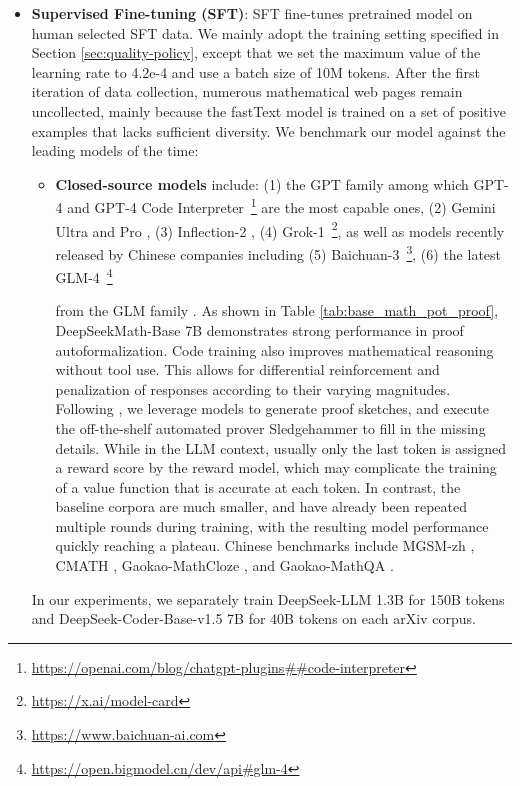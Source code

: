 \begin{itemize}
    \item  \textbf{Supervised Fine-tuning (SFT)}: SFT fine-tunes pretrained model on human selected SFT data. We mainly adopt the training setting specified in Section \ref{sec:quality-policy}, except that we set the maximum value of the learning rate to 4.2e-4 and use a batch size of 10M tokens. After the first iteration of data collection, numerous mathematical web pages remain uncollected, mainly because the fastText model is trained on a set of positive examples that lacks sufficient diversity. We benchmark our model against the leading models of the time:

\begin{itemize}[topsep=0pt]
    \item \textbf{Closed-source models} include: (1) the GPT family among which GPT-4 \citep{gpt4} and GPT-4 Code Interpreter~\footnote{\url{https://openai.com/blog/chatgpt-plugins\#\#code-interpreter}} are the most capable ones, (2) Gemini Ultra and Pro \citep{gemini}, (3) Inflection-2 \citep{inflection-2}, (4) Grok-1~\footnote{\url{https://x.ai/model-card}},
    as well as models recently released by Chinese companies including (5) Baichuan-3~\footnote{\url{https://www.baichuan-ai.com}},
    (6) the latest GLM-4~\footnote{\url{https://open.bigmodel.cn/dev/api\#glm-4}}

    from the GLM family \citep{glm}. As shown in Table \ref{tab:base_math_pot_proof}, DeepSeekMath-Base 7B demonstrates strong performance in proof autoformalization. Code training also improves mathematical reasoning without tool use. This allows for differential reinforcement and penalization of responses according to their varying magnitudes. Following \cite{dsp_proof}, we leverage models to generate proof sketches, and execute the off-the-shelf automated prover Sledgehammer \citep{sledgehammer} to fill in the missing details. While in the LLM context, usually only the last token is assigned a reward score by the reward model, which may complicate the training of a value function that is accurate at each token. In contrast, the baseline corpora are much smaller, and have already been repeated multiple rounds during training, with the resulting model performance quickly reaching a plateau. Chinese benchmarks include MGSM-zh \citep{mgsm}, CMATH \citep{wei2023cmath}, Gaokao-MathCloze \citep{agieval}, and Gaokao-MathQA \citep{agieval}. \end{itemize}

In our experiments, we separately train DeepSeek-LLM 1.3B for 150B tokens and DeepSeek-Coder-Base-v1.5 7B for 40B tokens on each arXiv corpus. \end{itemize}

